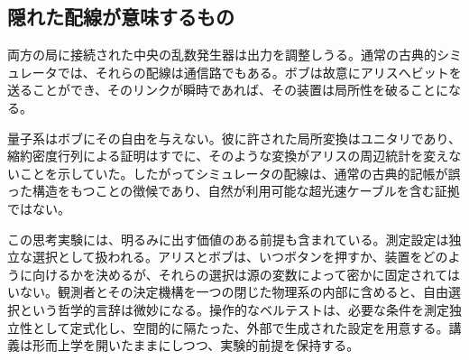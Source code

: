 \subsection{隠れた配線が意味するもの}

両方の局に接続された中央の乱数発生器は出力を調整しうる。通常の古典的シミュレータでは、それらの配線は通信路でもある。ボブは故意にアリスへビットを送ることができ、そのリンクが瞬時であれば、その装置は局所性を破ることになる。

量子系はボブにその自由を与えない。彼に許された局所変換はユニタリであり、縮約密度行列による証明はすでに、そのような変換がアリスの周辺統計を変えないことを示していた。したがってシミュレータの配線は、通常の古典的記帳が誤った構造をもつことの徴候であり、自然が利用可能な超光速ケーブルを含む証拠ではない。

\begin{classroomqa}
\end{classroomqa}

\begin{classroomqa}
\end{classroomqa}

この思考実験には、明るみに出す価値のある前提も含まれている。測定設定は独立な選択として扱われる。アリスとボブは、いつボタンを押すか、装置をどのように向けるかを決めるが、それらの選択は源の変数によって密かに固定されてはいない。観測者とその決定機構を一つの閉じた物理系の内部に含めると、自由選択という哲学的言辞は微妙になる。操作的なベルテストは、必要な条件を測定独立性として定式化し、空間的に隔たった、外部で生成された設定を用意する。講義は形而上学を開いたままにしつつ、実験的前提を保持する。

\begin{classroomqa}
\end{classroomqa}

